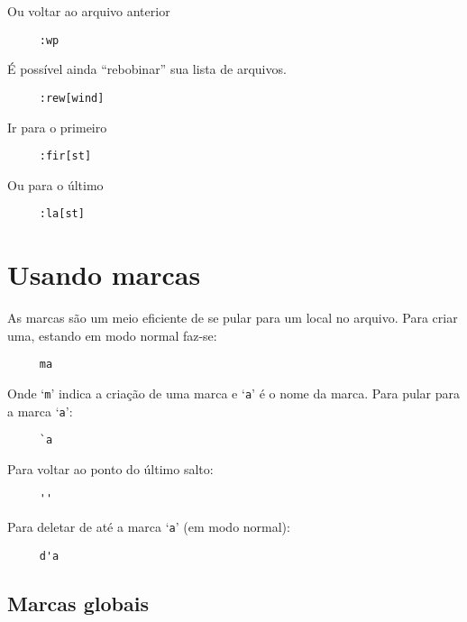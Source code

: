Ou voltar ao arquivo anterior

\begin{verbatim}
     :wp
\end{verbatim}

É possível ainda ``rebobinar'' sua lista de arquivos.

\begin{verbatim}
     :rew[wind]
\end{verbatim}

Ir para o primeiro

\begin{verbatim}
     :fir[st]
\end{verbatim}

Ou para o último

\begin{verbatim}
     :la[st]
\end{verbatim}

\section{Usando marcas}
\label{sec:UsandoMarcas}

As marcas são um meio eficiente de se pular para um local no arquivo. Para
criar uma,  estando em modo normal faz-se:

\begin{verbatim}
     ma
\end{verbatim}

Onde `{\tt m}' indica a criação de uma marca e `{\tt a}' é o nome da marca.
Para pular para a marca `{\tt a}':

\begin{verbatim}
     `a
\end{verbatim}

Para voltar ao ponto do último salto:

\begin{verbatim}
     ''
\end{verbatim}

Para deletar de até a marca `{\tt a}' (em modo normal):

\begin{verbatim}
     d'a
\end{verbatim}

\subsection{Marcas globais}

